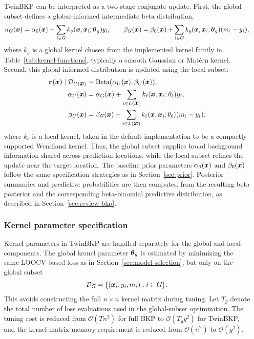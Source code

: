 \documentclass[article, shortnames]{jss}
\renewcommand{\vec}[1]{\mbox{\boldmath ${#1}$}}
\begin{document}
TwinBKP can be interpreted as a two-stage conjugate update. 
First, the global subset defines a global-informed intermediate beta distribution,
\[
\alpha_G(\vec{x}) 
= \alpha_0(\vec{x}) + \sum_{i\in G} k_g(\vec{x},\vec{x}_i;\vec{\theta}_g)y_i,
\qquad
\beta_G(\vec{x}) 
= \beta_0(\vec{x}) + \sum_{i\in G} k_g(\vec{x},\vec{x}_i;\vec{\theta}_g)(m_i-y_i),
\]
where $k_g$ is a global kernel chosen from the implemented kernel family in Table~\ref{tab:kernel-functions}, typically a smooth Gaussian or Mat{\'e}rn kernel. 
Second, this global-informed distribution is updated using the local subset:
\begin{align}
	\pi(\vec{x})\mid \mathcal{D}_{U(\vec{x})} 
	&\sim \mathrm{Beta}(\alpha_U(\vec{x}),\beta_U(\vec{x})), \notag\\
	\alpha_U(\vec{x}) 
	&= \alpha_G(\vec{x}) 
	+ \sum_{i\in L(\vec{x})} k_\ell(\vec{x},\vec{x}_i;\theta_\ell)y_i, \label{eq:twin-bkp}\\
	\beta_U(\vec{x}) 
	&= \beta_G(\vec{x}) 
	+ \sum_{i\in L(\vec{x})} k_\ell(\vec{x},\vec{x}_i;\theta_\ell)(m_i-y_i), \notag
\end{align}
where $k_\ell$ is a local kernel, taken in the default implementation to be a compactly supported Wendland kernel. 
Thus, the global subset supplies broad background information shared across prediction locations, while the local subset refines the update near the target location. 
The baseline prior parameters $\alpha_0(\vec{x})$ and $\beta_0(\vec{x})$ follow the same specification strategies as in Section~\ref{sec:prior}. 
Posterior summaries and predictive probabilities are then computed from the resulting beta posterior and the corresponding beta-binomial predictive distribution, as described in Section~\ref{sec:review-bkp}.

\subsubsection{Kernel parameter specification}

Kernel parameters in TwinBKP are handled separately for the global and local components. 
The global kernel parameter $\vec{\theta}_g$ is estimated by minimizing the same LOOCV-based loss as in Section~\ref{sec:model-selection}, but only on the global subset
\[
\mathcal{D}_G=\{(\vec{x}_i,y_i,m_i):i\in G\}.
\]
This avoids constructing the full $n\times n$ kernel matrix during tuning. 
Let $T_g$ denote the total number of loss evaluations used in the global-subset optimization. The tuning cost is reduced from $\mathcal{O}(T n^2)$ for full BKP to $\mathcal{O}(T_g g^2)$ for TwinBKP, and the kernel-matrix memory requirement is reduced from $\mathcal{O}(n^2)$ to $\mathcal{O}(g^2)$. 
\end{document}
